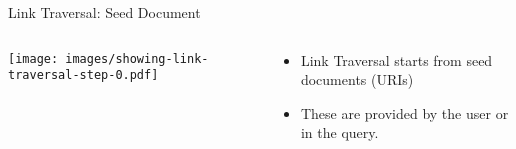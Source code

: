 
\begin{frame}{Link Traversal: Seed Document}
    \begin{columns}[T] %
        \begin{column}{0.6\textwidth} %
            \texttt{[image: images/showing-link-traversal-step-0.pdf]} %
        \end{column}

        \begin{column}{0.4\textwidth} %
            \begin{itemize}
                \item Link Traversal starts from seed documents (URIs)
                \item These are provided by the user or in the query.
            \end{itemize}
        \end{column}
    \end{columns}
\end{frame}

